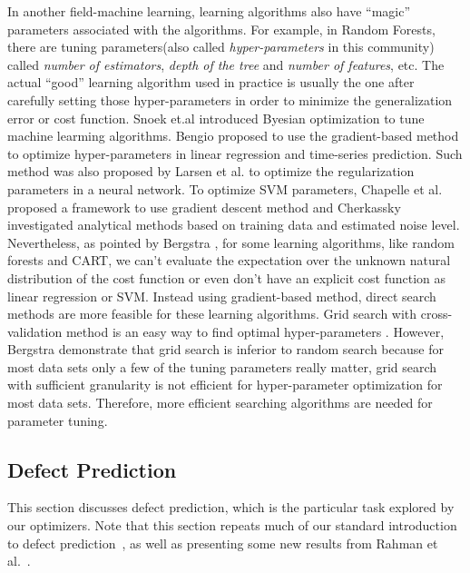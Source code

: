 In another field-machine learning, learning algorithms also have ``magic'' parameters associated with the algorithms. For example, in Random Forests\cite{breiman2001random}, there are tuning parameters(also called {\it hyper-parameters} in this community) called {\it number of estimators}, {\it depth of the tree} and {\it number of features}, etc. The actual ``good'' learning algorithm used in practice is usually the one after carefully setting those hyper-parameters in order to minimize the generalization error or cost function\cite{larsen1998adaptive,chapelle2002choosing,cherkassky2004practical,bengio2000gradient}. Snoek et.al \cite{snoek2012practical} introduced Byesian optimization to tune machine learming algorithms. Bengio \cite{bengio2000gradient} proposed to use the gradient-based method to optimize hyper-parameters in linear regression and time-series prediction. Such method was also proposed by Larsen et al.\cite{larsen1998adaptive} to optimize the regularization parameters in a neural network. To optimize SVM parameters, Chapelle et al. proposed a framework to use gradient descent method\cite{chapelle2002choosing} and Cherkassky investigated analytical methods based on training data and estimated noise level\cite{cherkassky2004practical}. Nevertheless, as pointed by Bergstra \cite{Bergstra2012}, for some learning algorithms, like random forests and CART, we can't evaluate the expectation over the unknown natural distribution of the cost function or even don't have an explicit cost function as linear regression or SVM. Instead using gradient-based method, direct search methods are more feasible for these learning algorithms. Grid search with cross-validation method is an easy way to find optimal hyper-parameters \cite{lerman1980fitting,hsu2003practical,jimenez2009finding,akay2009support}. However, Bergstra \cite{Bergstra2012} demonstrate that grid search is inferior to random search because for most data sets only a few of the tuning parameters really matter, grid search with  sufficient granularity is not efficient for hyper-parameter optimization for most data sets. Therefore, more efficient searching algorithms are needed for parameter tuning.

\subsection{Defect Prediction}


This section discusses defect prediction,
which is the particular
task explored by our optimizers.
Note that this section repeats much of 
our standard introduction to defect prediction~\cite{me15:book1},
as well as presenting    some new results from Rahman et al.~\cite{rahman14:icse}. 
 



